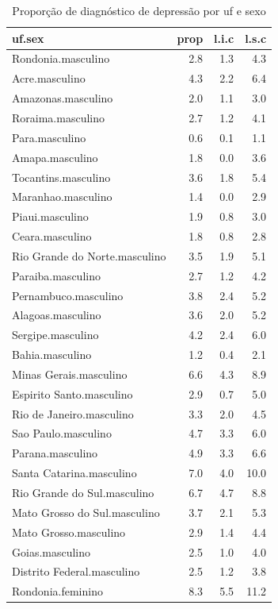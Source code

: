 \documentclass[]{book}
\numberwithin{example}{chapter}
\numberwithin{remark}{chapter}
\numberwithin{definition}{chapter}
\begin{document}
\begin{table}

\caption{\label{tab:unnamed-chunk-46}Proporção de diagnóstico de depressão por uf e sexo}
\centering
\begin{tabular}[t]{lrrr}
\toprule
uf.sex & prop & l.i.c & l.s.c\\
\midrule
Rondonia.masculino & 2.8 & 1.3 & 4.3\\
Acre.masculino & 4.3 & 2.2 & 6.4\\
Amazonas.masculino & 2.0 & 1.1 & 3.0\\
Roraima.masculino & 2.7 & 1.2 & 4.1\\
Para.masculino & 0.6 & 0.1 & 1.1\\
\addlinespace
Amapa.masculino & 1.8 & 0.0 & 3.6\\
Tocantins.masculino & 3.6 & 1.8 & 5.4\\
Maranhao.masculino & 1.4 & 0.0 & 2.9\\
Piaui.masculino & 1.9 & 0.8 & 3.0\\
Ceara.masculino & 1.8 & 0.8 & 2.8\\
\addlinespace
Rio Grande do Norte.masculino & 3.5 & 1.9 & 5.1\\
Paraiba.masculino & 2.7 & 1.2 & 4.2\\
Pernambuco.masculino & 3.8 & 2.4 & 5.2\\
Alagoas.masculino & 3.6 & 2.0 & 5.2\\
Sergipe.masculino & 4.2 & 2.4 & 6.0\\
\addlinespace
Bahia.masculino & 1.2 & 0.4 & 2.1\\
Minas Gerais.masculino & 6.6 & 4.3 & 8.9\\
Espirito Santo.masculino & 2.9 & 0.7 & 5.0\\
Rio de Janeiro.masculino & 3.3 & 2.0 & 4.5\\
Sao Paulo.masculino & 4.7 & 3.3 & 6.0\\
\addlinespace
Parana.masculino & 4.9 & 3.3 & 6.6\\
Santa Catarina.masculino & 7.0 & 4.0 & 10.0\\
Rio Grande do Sul.masculino & 6.7 & 4.7 & 8.8\\
Mato Grosso do Sul.masculino & 3.7 & 2.1 & 5.3\\
Mato Grosso.masculino & 2.9 & 1.4 & 4.4\\
\addlinespace
Goias.masculino & 2.5 & 1.0 & 4.0\\
Distrito Federal.masculino & 2.5 & 1.2 & 3.8\\
Rondonia.feminino & 8.3 & 5.5 & 11.2\\

\end{tabular}
\end{table}
\end{document}
